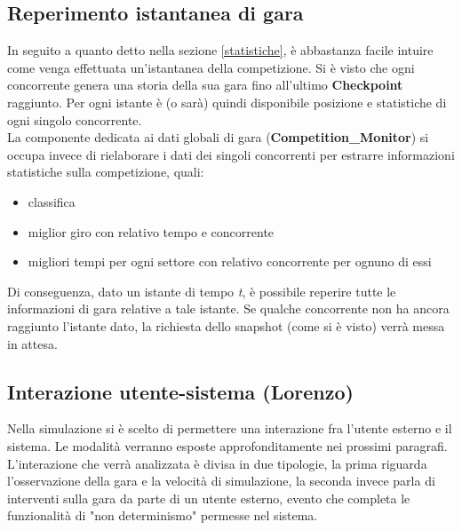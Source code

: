 \subsection{Reperimento istantanea di gara}
    In seguito a quanto detto nella sezione \ref{statistiche}, è abbastanza
facile intuire come venga effettuata un'istantanea della competizione.
    Si è visto che ogni concorrente genera una storia della sua gara fino
all'ultimo \textbf{Checkpoint} raggiunto. Per ogni istante è (o sarà)
    quindi disponibile posizione e statistiche di ogni singolo concorrente.\\
    La componente dedicata ai dati globali di gara
(\textbf{Competition\_Monitor}) si occupa invece di rielaborare i dati dei
singoli concorrenti
    per estrarre informazioni statistiche sulla competizione, quali:
    \begin{itemize}
    \item classifica
    \item miglior giro con relativo tempo e concorrente
    \item migliori tempi per ogni settore con relativo concorrente per ognuno di
essi
    \end{itemize}
    Di conseguenza, dato un istante di tempo \emph{t}, è possibile reperire
tutte le informazioni di gara relative a tale istante. Se qualche 
    concorrente non ha ancora raggiunto l'istante dato, la richiesta dello
snapshot (come si è visto) verrà messa in attesa.
\subsection{Interazione utente-sistema (Lorenzo)}
Nella simulazione si è scelto di permettere una interazione fra l'utente esterno
e il sistema. Le modalità verranno esposte approfonditamente nei prossimi
paragrafi. L'interazione che verrà analizzata è divisa in due tipologie, la
prima riguarda l'osservazione della gara e la velocità di simulazione, la
seconda invece parla di interventi sulla gara da parte di un utente esterno,
evento che completa le funzionalità di "non determinismo" permesse nel sistema.
